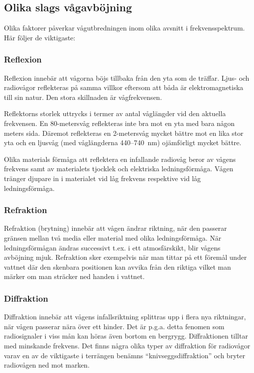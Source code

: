 \subsection{Olika slags vågavböjning}

Olika faktorer påverkar vågutbredningen inom olika avsnitt i
frekvensspektrum. Här följer de viktigaste:

\subsubsection{Reflexion}

Reflexion innebär att vågorna böjs tillbaka från den yta som de träffar.
Ljus- och radiovågor reflekteras på samma villkor eftersom
att båda är elektromagnetiska till sin natur.
Den stora skillnaden är vågfrekvensen.

Reflektorns storlek uttrycks i termer av antal våglängder vid den
aktuella frekvensen.
En 80-metersvåg reflekteras inte bra mot en yta med bara någon meters sida.
Däremot reflekteras en 2-metersvåg mycket bättre mot en lika stor yta och en
ljusvåg (med våglängderna 440--740~nm) ojämförligt mycket bättre.

Olika materials förmåga att reflektera en infallande radiovåg beror av
vågens frekvens samt av materialets tjocklek och elektriska ledningsförmåga.
Vågen tränger djupare in i materialet vid låg frekvens respektive vid låg
ledningsförmåga.

\subsubsection{Refraktion}

Refraktion (brytning) innebär att vågen ändrar riktning, när den
passerar gränsen mellan två media eller material med olika
ledningsförmåga.  När ledningsförmågan ändras successivt t.ex. i ett
atmosfärskikt, blir vågens avböjning mjuk. Refraktion sker exempelvis
när man tittar på ett föremål under vattnet där den skenbara
positionen kan avvika från den riktiga vilket man märker om man
sträcker ned handen i vattnet.

\subsubsection{Diffraktion}

Diffraktion innebär att vågens infallsriktning splittras upp i flera
nya riktningar, när vågen passerar nära över ett hinder.  Det är
p.g.a. detta fenomen som radiosignaler i viss mån kan höras även
bortom en bergrygg.
Diffraktionen tilltar med minskande frekvens. Det finns några olika
typer av diffraktion för radiovågor varav en av de viktigaste i
terrängen benämns ``knivseggsdiffraktion'' och bryter radiovågen ned
mot marken.
